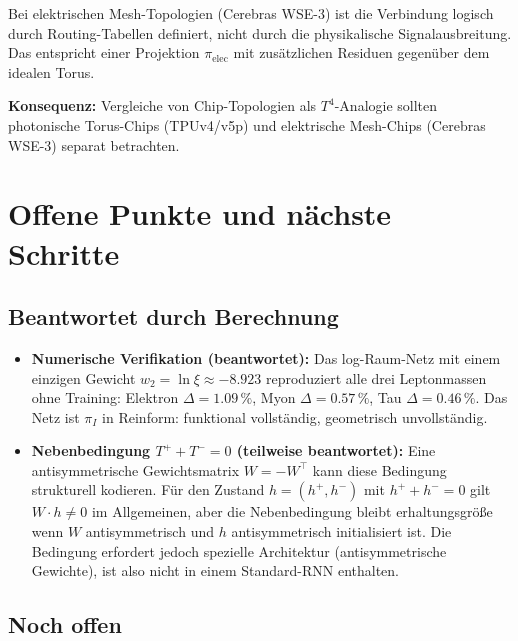 Bei elektrischen Mesh-Topologien (Cerebras WSE-3) ist die Verbindung
logisch durch Routing-Tabellen definiert, nicht durch die physikalische
Signalausbreitung. Das entspricht einer Projektion $\pi_\text{elec}$
mit zusätzlichen Residuen gegenüber dem idealen Torus.

\textbf{Konsequenz:} Vergleiche von Chip-Topologien als $T^4$-Analogie
sollten photonische Torus-Chips (TPUv4/v5p) und elektrische Mesh-Chips
(Cerebras WSE-3) separat betrachten.


\section{Offene Punkte und nächste Schritte}

\subsection*{Beantwortet durch Berechnung}

\begin{itemize}
  \item \textbf{Numerische Verifikation (beantwortet):}
        Das log-Raum-Netz mit einem einzigen Gewicht $w_2 = \ln\xi \approx -8.923$
        reproduziert alle drei Leptonmassen ohne Training:
        Elektron $\Delta=1.09\,\%$, Myon $\Delta=0.57\,\%$, Tau $\Delta=0.46\,\%$.
        Das Netz ist $\pi_I$ in Reinform: funktional vollständig, geometrisch unvollständig.

  \item \textbf{Nebenbedingung $T^+ + T^- = 0$ (teilweise beantwortet):}
        Eine antisymmetrische Gewichtsmatrix $W = -W^\top$ kann diese Bedingung
        strukturell kodieren. Für den Zustand $h = (h^+, h^-)$ mit $h^+ + h^- = 0$
        gilt $W \cdot h \neq 0$ im Allgemeinen, aber die Nebenbedingung bleibt
        erhaltungsgröße wenn $W$ antisymmetrisch und $h$ antisymmetrisch initialisiert
        ist. Die Bedingung erfordert jedoch spezielle Architektur (antisymmetrische
        Gewichte), ist also nicht in einem Standard-RNN enthalten.
\end{itemize}

\subsection*{Noch offen}

